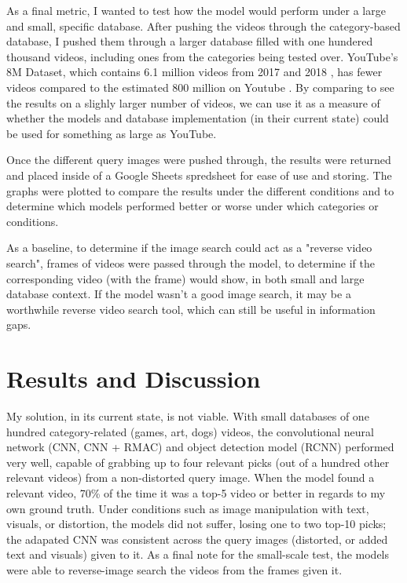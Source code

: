 \documentclass[10pt,twocolumn]{article}
\begin{document}
As a final metric, I wanted to test how the model would perform under a large and small, specific database. After pushing the videos through the category-based database, I pushed them through a larger database filled with one hundered thousand videos, including ones from the categories being tested over. YouTube’s 8M Dataset, which contains 6.1 million videos from 2017 and 2018 \cite{googleYT8M}, has fewer videos compared to the estimated 800 million on Youtube \cite{EarthWeb TODO}. By comparing to see the results on a slighly larger number of videos, we can use it as a measure of whether the models and database implementation (in their current state) could be used for something as large as YouTube.

Once the different query images were pushed through, the results were returned and placed inside of a Google Sheets spredsheet for ease of use and storing. The graphs were plotted to compare the results under the different conditions and to determine which models performed better or worse under which categories or conditions.


As a baseline, to determine if the image search could act as a "reverse video search", frames of videos were passed through the model, to determine if the corresponding video (with the frame) would show, in both small and large database context. If the model wasn't a good image search, it may be a worthwhile reverse video search tool, which can still be useful in information gaps.

\section{Results and Discussion}

My solution, in its current state, is not viable. With small databases of one hundred category-related (games, art, dogs) videos, the convolutional neural network (CNN, CNN + RMAC) and object detection model (RCNN) performed very well, capable of grabbing up to four relevant picks (out of a hundred other relevant videos) from a non-distorted query image. When the model found a relevant video, 70\% of the time it was a top-5 video or better in regards to my own ground truth.
Under conditions such as image manipulation with text, visuals, or distortion, the models did not suffer, losing one to two top-10 picks; the adapated CNN was consistent across the query images (distorted, or added text and visuals) given to it. As a final note for the small-scale test, the models were able to reverse-image search the videos from the frames given it. 
\end{document}
